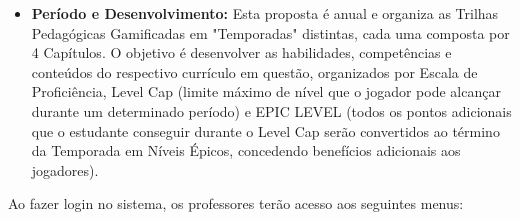 \begin{itemize}
\\
\item \textbf{Período e Desenvolvimento:} Esta proposta é anual e organiza as Trilhas Pedagógicas Gamificadas em "Temporadas" distintas, cada uma composta por 4 Capítulos. O objetivo é desenvolver as habilidades, competências e conteúdos do respectivo currículo em questão, organizados por Escala de Proficiência, Level Cap (limite máximo de nível que o jogador pode alcançar durante um determinado período) e EPIC LEVEL (todos os pontos adicionais que o estudante conseguir durante o Level Cap serão convertidos ao término da Temporada em Níveis Épicos, concedendo benefícios adicionais aos jogadores).
\\
\end{itemize}

Ao fazer login no sistema, os professores terão acesso aos seguintes menus:
\\

